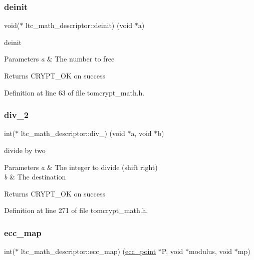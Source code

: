 \subsubsection{\texorpdfstring{deinit}{deinit}}
{\footnotesize\ttfamily void($\ast$ ltc\+\_\+math\+\_\+descriptor\+::deinit) (void $\ast$a)}



deinit 


\begin{DoxyParams}{Parameters}
{\em a} & The number to free \\
\hline
\end{DoxyParams}
\begin{DoxyReturn}{Returns}
C\+R\+Y\+P\+T\+\_\+\+OK on success 
\end{DoxyReturn}


Definition at line 63 of file tomcrypt\+\_\+math.\+h.

\mbox{\label{structltc__math__descriptor_a2ea0c675165d9e8aaa99b65b82b97fbb}} 
\subsubsection{\texorpdfstring{div\_2}{div\_2}}
{\footnotesize\ttfamily int($\ast$ ltc\+\_\+math\+\_\+descriptor\+::div\+\_) (void $\ast$a, void $\ast$b)}



divide by two 


\begin{DoxyParams}{Parameters}
{\em a} & The integer to divide (shift right) \\
\hline
{\em b} & The destination \\
\hline
\end{DoxyParams}
\begin{DoxyReturn}{Returns}
C\+R\+Y\+P\+T\+\_\+\+OK on success 
\end{DoxyReturn}


Definition at line 271 of file tomcrypt\+\_\+math.\+h.

\mbox{\label{structltc__math__descriptor_a4855dff07d894997cc3fb66a93b45a88}} 
\subsubsection{\texorpdfstring{ecc\_map}{ecc\_map}}
{\footnotesize\ttfamily int($\ast$ ltc\+\_\+math\+\_\+descriptor\+::ecc\+\_\+map) (\mbox{\hyperlink{tomcrypt__math_8h_a2a6efaeaa795aa54274d7c4fd66b018a}{ecc\+\_\+point}} $\ast$P, void $\ast$modulus, void $\ast$mp)}



